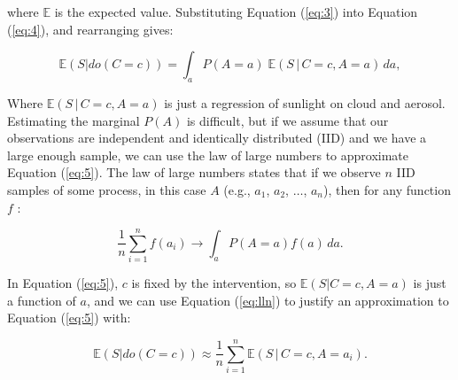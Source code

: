 \documentclass[12pt]{article}
\begin{document}
where $\mathbb{E}$ is the expected value. Substituting Equation
(\ref{eq:3}) into Equation (\ref{eq:4}), and rearranging gives:

\begin{equation} \mathbb{E}(S | do(C = c)) = \int_{a} P(A=a) \;
  \mathbb{E}(S \, | \, C=c, A=a) \, d a,
  \label{eq:5}
\end{equation}

Where $\mathbb{E}(S \, | \, C=c, A=a)$ is just a regression of
sunlight on cloud and aerosol. Estimating the marginal $P(A)$ is
difficult, but if we assume that our observations are independent and
identically distributed (IID) and we have a large enough sample, we
can use the law of large numbers to approximate Equation
(\ref{eq:5}). The law of large numbers states that if we observe $n$
IID samples of some process, in this case $A$ (e.g., $a_1$, $a_2$,
$\ldots$, $a_n$), then for any function $f$ \citep{shalizi2013}:

\begin{equation} \frac{1}{n} \sum_{i=1}^n f(a_i) \to \int_a P(A=a)
  f(a) \, d a.
  \label{eq:lln}
\end{equation}

In Equation (\ref{eq:5}), $c$ is fixed by the intervention, so
$\mathbb{E}(S| C=c, A=a)$ is just a function of $a$, and we can use
Equation (\ref{eq:lln}) to justify an approximation to Equation
(\ref{eq:5}) with:

\begin{equation} \mathbb{E}(S | do(C = c)) \approx \frac{1}{n}
  \sum_{i=1}^n \mathbb{E}(S \, | \, C=c, A=a_i).
  \label{eq:6}
\end{equation}
\end{document}
